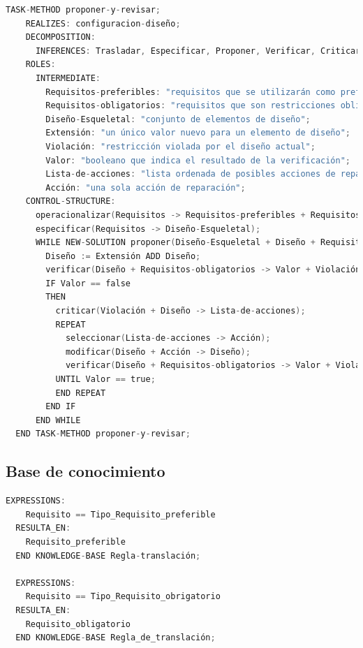 \begin{lstlisting}[language=C,caption=\textbf{Método de la tarea}]
  TASK-METHOD proponer-y-revisar;
    REALIZES: configuracion-diseño;
    DECOMPOSITION:
      INFERENCES: Trasladar, Especificar, Proponer, Verificar, Criticar, Seleccionar, Modificar;
    ROLES:
      INTERMEDIATE:
        Requisitos-preferibles: "requisitos que se utilizarán como preferencias (suaves)";
        Requisitos-obligatorios: "requisitos que son restricciones obligatorias (estrictas)";
        Diseño-Esqueletal: "conjunto de elementos de diseño";
        Extensión: "un único valor nuevo para un elemento de diseño";
        Violación: "restricción violada por el diseño actual";
        Valor: "booleano que indica el resultado de la verificación";
        Lista-de-acciones: "lista ordenada de posibles acciones de reparación (fijación)";
        Acción: "una sola acción de reparación";
    CONTROL-STRUCTURE:
      operacionalizar(Requisitos -> Requisitos-preferibles + Requisitos-obligatorios);
      especificar(Requisitos -> Diseño-Esqueletal);
      WHILE NEW-SOLUTION proponer(Diseño-Esqueletal + Diseño + Requisitos-preferibles -> Extensión) DO
        Diseño := Extensión ADD Diseño;
        verificar(Diseño + Requisitos-obligatorios -> Valor + Violación);
        IF Valor == false
        THEN
          criticar(Violación + Diseño -> Lista-de-acciones);
          REPEAT
            seleccionar(Lista-de-acciones -> Acción);
            modificar(Diseño + Acción -> Diseño);
            verificar(Diseño + Requisitos-obligatorios -> Valor + Violación);
          UNTIL Valor == true;
          END REPEAT
        END IF
      END WHILE
  END TASK-METHOD proponer-y-revisar;
\end{lstlisting}

\subsection{Base de conocimiento}

\begin{lstlisting}[language=C,caption=\textbf{Regla\_de\_Traslación}]
  EXPRESSIONS:
    Requisito == Tipo_Requisito_preferible
  RESULTA_EN:
    Requisito_preferible
  END KNOWLEDGE-BASE Regla-translación;
    
  EXPRESSIONS:
    Requisito == Tipo_Requisito_obrigatorio
  RESULTA_EN:
    Requisito_obligatorio
  END KNOWLEDGE-BASE Regla_de_translación;
\end{lstlisting}


